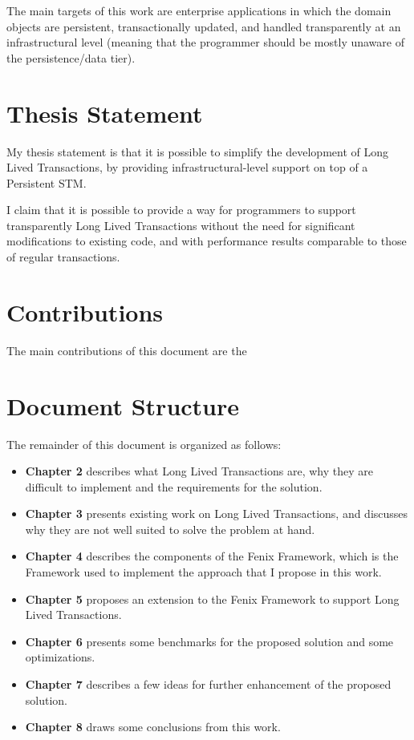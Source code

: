 The main targets of this work are enterprise applications in which the
domain objects are persistent, transactionally updated, and handled
transparently at an infrastructural level (meaning that the programmer
should be mostly unaware of the persistence/data tier).

\section{Thesis Statement}

My thesis statement is that it is possible to simplify the development
of Long Lived Transactions, by providing infrastructural-level support
on top of a Persistent STM.

I claim that it is possible to provide a way for programmers to
support transparently Long Lived Transactions without the need for
significant modifications to existing code, and with performance
results comparable to those of regular transactions.

\section{Contributions}

The main contributions of this document are the 

\section{Document Structure}

The remainder of this document is organized as follows:

\begin{itemize}

\item {\bf Chapter 2} describes what Long Lived Transactions are, why
  they are difficult to implement and the requirements for the solution.

\item {\bf Chapter 3} presents existing work on Long Lived
  Transactions, and discusses why they are not well suited to solve
  the problem at hand.

\item {\bf Chapter 4} describes the components of the Fenix Framework,
  which is the Framework used to implement the approach that I propose
  in this work.

\item {\bf Chapter 5} proposes an extension to the Fenix Framework to
  support Long Lived Transactions.

\item {\bf Chapter 6} presents some benchmarks for the proposed
  solution and some optimizations.

\item {\bf Chapter 7} describes a few ideas for further enhancement of
  the proposed solution.

\item {\bf Chapter 8} draws some conclusions from this work.

\end{itemize}